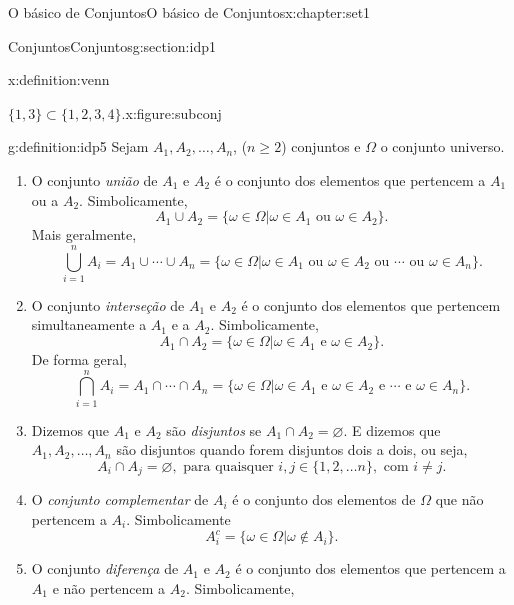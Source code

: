 \documentclass[oneside,10pt,]{book}
\numberwithin{equation}{section}
\begin{document}
\begin{chapterptx}{O básico de Conjuntos}{}{O básico de Conjuntos}{}{}{x:chapter:set1}
\begin{sectionptx}{Conjuntos}{}{Conjuntos}{}{}{g:section:idp1}
\begin{definition}{}{x:definition:venn}
\begin{figureptx}{\(\{1, 3\} \subset \{1, 2, 3, 4\}\).}{x:figure:subconj}{}
\begin{image}{0.35}{0.3}{0.35}
\end{image}%
\tcblower
\end{figureptx}%
%
\end{definition}
\begin{definition}{}{g:definition:idp5}%
Sejam \(A_1, A_2, \ldots, A_n\), (\(n\geq 2\)) conjuntos e \(\Omega\) o conjunto universo.%
%
\begin{multicols}{1}
\begin{enumerate}
\item{}O conjunto \emph{união} de \(A_1\) e \(A_2\) é o conjunto dos elementos que pertencem a \(A_1\) ou a \(A_2\). Simbolicamente,%
\begin{equation*}
A_1\cup A_2 = \{ \omega\in\Omega| \omega\in A_1 \text{ ou } \omega\in A_2 \}. 
\end{equation*}
Mais geralmente,%
\begin{equation*}
\bigcup_{i=1}^{n}A_i = A_1\cup \cdots \cup A_n =\{ \omega\in\Omega| \omega\in A_1 \text{ ou } \omega\in A_2 \text{ ou }\cdots \text{ ou } \omega\in A_n \}. 
\end{equation*}
%
\item{}O conjunto \emph{interseção} de \(A_1\) e \(A_2\) é o conjunto dos elementos que pertencem simultaneamente a \(A_1\) e a \(A_2\). Simbolicamente,%
\begin{equation*}
A_1\cap A_2 = \{ \omega\in\Omega| \omega\in A_1 \text{ e } \omega\in A_2 \}. 
\end{equation*}
De forma geral,%
\begin{equation*}
\bigcap_{i=1}^{n}A_i = A_1\cap \cdots \cap A_n =\{ \omega\in\Omega| \omega\in A_1 \text{ e } \omega\in A_2 \text{ e }\cdots \text{ e } \omega\in A_n \}. 
\end{equation*}
%
\item{}Dizemos que \(A_1\) e \(A_2\) são \emph{disjuntos} se \(A_1\cap A_2=\varnothing\). E dizemos que \(A_1, A_2, \ldots, A_n\) são disjuntos quando forem disjuntos dois a dois, ou seja,%
\begin{equation*}
A_i\cap A_j = \varnothing, \text{ para quaisquer } i, j \in\{1, 2, \ldots n\}, \text{ com } i\neq j. 
\end{equation*}
%
\item{}O \emph{conjunto complementar} de \(A_i\) é o conjunto dos elementos de \(\Omega\) que não pertencem a \(A_i\). Simbolicamente%
\begin{equation*}
A_i^c = \{ \omega\in\Omega| \omega\notin A_i \}. 
\end{equation*}
%
\item{}O conjunto \emph{diferença} de \(A_1\) e \(A_2\) é o conjunto dos elementos que pertencem a \(A_1\) e não pertencem a \(A_2\). Simbolicamente,%

\end{enumerate}
\end{multicols}
\end{definition}
\end{sectionptx}
\end{chapterptx}
\end{document}
